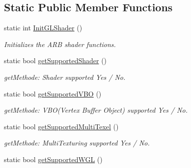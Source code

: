\subsection*{Static Public Member Functions}
\begin{DoxyCompactItemize}
\item 
static int \hyperlink{class_f2_c_1_1_shader_g_l_a2ac17352f8c2e12a812871ce45e280c4}{InitGLShader} ()
\begin{DoxyCompactList}\small\item\em Initializes the ARB shader functions. \item\end{DoxyCompactList}\item 
\hypertarget{class_f2_c_1_1_shader_g_l_aa2a774dfadfab1546caa25f245adb5ff}{
static bool \hyperlink{class_f2_c_1_1_shader_g_l_aa2a774dfadfab1546caa25f245adb5ff}{getSupportedShader} ()}
\label{class_f2_c_1_1_shader_g_l_aa2a774dfadfab1546caa25f245adb5ff}

\begin{DoxyCompactList}\small\item\em getMethode: Shader supported Yes / No. \item\end{DoxyCompactList}\item 
\hypertarget{class_f2_c_1_1_shader_g_l_aec2dd652bc0bb2374ae969456e0f98d5}{
static bool \hyperlink{class_f2_c_1_1_shader_g_l_aec2dd652bc0bb2374ae969456e0f98d5}{getSupportedVBO} ()}
\label{class_f2_c_1_1_shader_g_l_aec2dd652bc0bb2374ae969456e0f98d5}

\begin{DoxyCompactList}\small\item\em getMethode: VBO(Vertex Buffer Object) supported Yes / No. \item\end{DoxyCompactList}\item 
\hypertarget{class_f2_c_1_1_shader_g_l_a3becfda95f67a1af56ae53abe213779f}{
static bool \hyperlink{class_f2_c_1_1_shader_g_l_a3becfda95f67a1af56ae53abe213779f}{getSupportedMultiTexel} ()}
\label{class_f2_c_1_1_shader_g_l_a3becfda95f67a1af56ae53abe213779f}

\begin{DoxyCompactList}\small\item\em getMethode: MultiTexturing supported Yes / No. \item\end{DoxyCompactList}\item 
\hypertarget{class_f2_c_1_1_shader_g_l_a61cd927d89966c42eae04d5fab870573}{
static bool \hyperlink{class_f2_c_1_1_shader_g_l_a61cd927d89966c42eae04d5fab870573}{getSupportedWGL} ()}
\label{class_f2_c_1_1_shader_g_l_a61cd927d89966c42eae04d5fab870573}


\end{DoxyCompactItemize}
